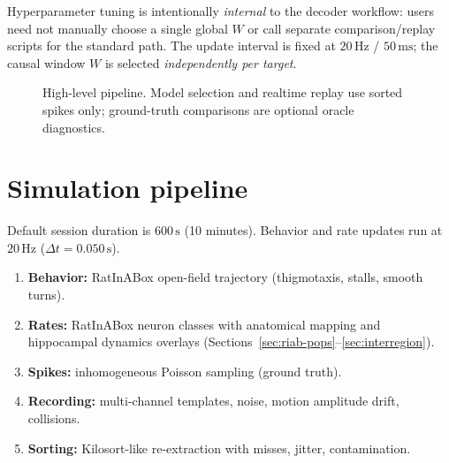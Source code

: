 \documentclass[11pt,a4paper]{article}
\begin{document}
Hyperparameter tuning is intentionally \emph{internal} to the decoder workflow: users need not manually choose a single global $W$ or call separate comparison/replay scripts for the standard path.
The update interval is fixed at $20\,\mathrm{Hz}$ / $50\,\mathrm{ms}$; the causal window $W$ is selected \emph{independently per target}.

\begin{figure}[h]
\centering
{}
\caption{High-level pipeline.
Model selection and realtime replay use sorted spikes only; ground-truth comparisons are optional oracle diagnostics.}
\label{fig:pipeline}
\end{figure}

\section{Simulation pipeline}

Default session duration is $600\,\mathrm{s}$ (10 minutes). Behavior and rate updates run at $20\,\mathrm{Hz}$ ($\Delta t = 0.050\,\mathrm{s}$).

\begin{enumerate}[leftmargin=*]
  \item \textbf{Behavior:} RatInABox open-field trajectory (thigmotaxis, stalls, smooth turns).
  \item \textbf{Rates:} RatInABox neuron classes with anatomical mapping and hippocampal dynamics overlays (Sections~\ref{sec:riab-pops}--\ref{sec:interregion}).
  \item \textbf{Spikes:} inhomogeneous Poisson sampling (ground truth).
  \item \textbf{Recording:} multi-channel templates, noise, motion amplitude drift, collisions.
  \item \textbf{Sorting:} Kilosort-like re-extraction with misses, jitter, contamination.
\end{enumerate}
\end{document}
